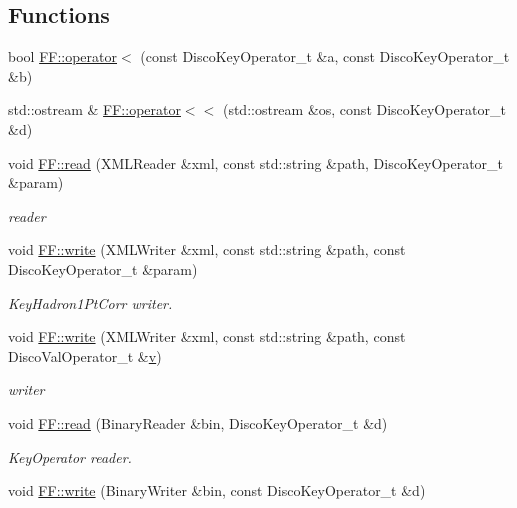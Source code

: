 \subsection*{Functions}
\begin{DoxyCompactItemize}
\item 
bool \mbox{\hyperlink{namespaceFF_a84e77b5ad9222ac85655c36949abf276}{F\+F\+::operator$<$}} (const Disco\+Key\+Operator\+\_\+t \&a, const Disco\+Key\+Operator\+\_\+t \&b)
\item 
std\+::ostream \& \mbox{\hyperlink{namespaceFF_ac2ee6d46f8316f1f3631105fbeab604c}{F\+F\+::operator$<$$<$}} (std\+::ostream \&os, const Disco\+Key\+Operator\+\_\+t \&d)
\item 
void \mbox{\hyperlink{namespaceFF_a4e59e8e764d20bb787e2992c247ca80f}{F\+F\+::read}} (X\+M\+L\+Reader \&xml, const std\+::string \&path, Disco\+Key\+Operator\+\_\+t \&param)
\begin{DoxyCompactList}\small\item\em reader \end{DoxyCompactList}\item 
void \mbox{\hyperlink{namespaceFF_a831b58b450a964b114e0fce65fc4de99}{F\+F\+::write}} (X\+M\+L\+Writer \&xml, const std\+::string \&path, const Disco\+Key\+Operator\+\_\+t \&param)
\begin{DoxyCompactList}\small\item\em Key\+Hadron1\+Pt\+Corr writer. \end{DoxyCompactList}\item 
void \mbox{\hyperlink{namespaceFF_a0c22ea2c009e3006aa0f745b9a3e2cc2}{F\+F\+::write}} (X\+M\+L\+Writer \&xml, const std\+::string \&path, const Disco\+Val\+Operator\+\_\+t \&\mbox{\hyperlink{adat__devel_2lib_2hadron_2hadron__timeslice_8cc_a716fc87f5e814be3ceee2405ed6ff22a}{v}})
\begin{DoxyCompactList}\small\item\em writer \end{DoxyCompactList}\item 
void \mbox{\hyperlink{namespaceFF_a90d854af01e30d52191dff4341fcd4ad}{F\+F\+::read}} (Binary\+Reader \&bin, Disco\+Key\+Operator\+\_\+t \&d)
\begin{DoxyCompactList}\small\item\em Key\+Operator reader. \end{DoxyCompactList}\item 
void \mbox{\hyperlink{namespaceFF_a5c3e38934ee51ae23bc9d39dca34acc1}{F\+F\+::write}} (Binary\+Writer \&bin, const Disco\+Key\+Operator\+\_\+t \&d)

\end{DoxyCompactItemize}
